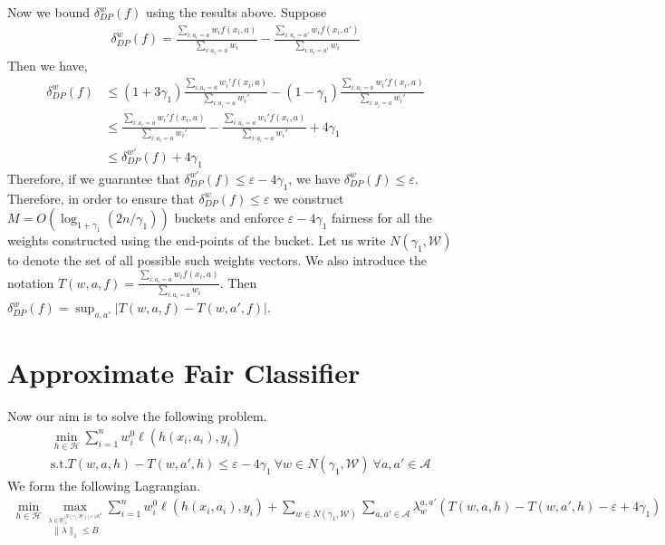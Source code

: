 \documentclass{article}
\newcommand{\bbR}{\mathbb{R}}
\newcommand{\WW}{\mathcal{W}}
\newcommand{\abs}[1]{\left|#1\right|}
\newcommand{\Ac}{\mathcal{A}}
\newcommand{\HH}{\mathcal{H}}
\newcommand{\eps}{\varepsilon}
\newcommand{\norm}[1]{\lVert #1 \rVert}
\begin{document}
Now we bound $\delta^w_{DP}(f)$ using the results above. Suppose
\begin{align*}
\delta^w_{DP}(f) = \frac{\sum_{i: a_i = a} w_i f(x_i,a)}{\sum_{i: a_i = a} w_i} -  \frac{\sum_{i: a_i = a'} w_i f(x_i,a')}{\sum_{i: a_i = a'} w_i}
\end{align*}
Then we have,
\begin{align*}
\delta^w_{DP}(f) &\le (1+3\gamma_1)  \frac{\sum_{i: a_i = a} w_i' f(x_i,a)}{\sum_{i: a_i = a} w_i'} - (1-\gamma_1) \frac{\sum_{i: a_i = a} w_i' f(x_i,a)}{\sum_{i: a_i = a} w_i'}  \\
&\le  \frac{\sum_{i: a_i = a} w_i' f(x_i,a)}{\sum_{i: a_i = a} w_i'} -  \frac{\sum_{i: a_i = a} w_i' f(x_i,a)}{\sum_{i: a_i = a} w_i'} + 4\gamma_1\\
&\le \delta^{w'}_{DP}(f) + 4\gamma_1
\end{align*}
Therefore, if we guarantee that $\delta^{w'}_{DP}(f) \le \eps -4\gamma_1$, we have $\delta^w_{DP}(f) \le \eps$. Therefore, in order to ensure that $\delta^w_{DP}(f) \le \eps$ we construct $M = O(\log_{1+\gamma_1}(2n/\gamma_1) )$ buckets and enforce $\eps-4\gamma_1$ fairness for all the weights constructed using the end-points of the bucket. Let us write $N(\gamma_1,\WW)$ to denote the set of all possible such weights vectors. We also introduce the notation $T(w,a,f) = \frac{\sum_{i: a_i = a} w_i f(x_i,a)}{\sum_{i: a_i = a} w_i}$. Then $\delta^w_{DP}(f) = \sup_{a,a'}\abs{T(w,a,f) - T(w,a',f)}$. 
\section{Approximate Fair Classifier}
Now our aim is to solve the following problem.
\begin{align}
&\min_{h \in \HH} \sum_{i=1}^n w^0_i \ell(h(x_i,a_i),y_i)\label{eq:final-objective}\\
&\text{s.t.} T(w,a,h) - T(w,a',h) \le \eps - 4\gamma_1\ \forall w \in N(\gamma_1,\WW) \ \forall a,a' \in \Ac \nonumber
\end{align}
We form the following Lagrangian.
\begin{align}\label{eq:lagrangian}
\min_{h \in \HH} \max_{\stackrel{\lambda \in \bbR^{\abs{N(\gamma_1,\WW)} \times \abs{\Ac}^2}_+}{ \norm{\lambda}_1 \le B} } \sum_{i=1}^n w^0_i \ell(h(x_i,a_i),y_i) + \sum_{w \in N(\gamma_1,\WW)} \sum_{a,a' \in \Ac} \lambda_w^{a,a'} ( T(w,a,h) - T(w,a',h) - \eps + 4\gamma_1)
\end{align}
\end{document}

